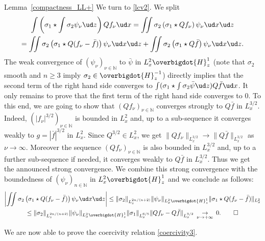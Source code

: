 \begin{ProofOf}{Lemma~\ref{compactness_LL+}}
We turn to \eqref{lcv2}. We split
\begin{multline*}
\int\left(\sigma_{1}\star\int\sigma_{2}\psi_{\nu}\ud z\right)Qf_{\nu}\ud x=\iint\sigma_{2}\left(\sigma_{1}\star Qf_{\nu}\right)\psi_{\nu}\ud x\ud z\\
=\iint\sigma_{2}\left(\sigma_{1}\star Q(f_{\nu}-\bar{f})\right)\psi_{\nu}\ud x\ud z+\iint\sigma_{2}\left(\sigma_{1}\star Q\bar{f}\right)\psi_{\nu}\ud x\ud z.
\end{multline*}
The weak convergence of $(\psi_{\nu})_{\nu\in\mathbb N}$ to $\bar{\psi}$ in $L_{x}^{2}\overbigdot{H}_{z}^{1}$ (note that $\sigma_{2}$ smooth and $n\geq 3$ imply $\sigma_{2}\in\overbigdot{H}_{z}^{-1}$) directly implies that
the second term of the right hand side converges to $\int(\sigma_{1}\star\int\sigma_{2}\bar{\psi}\ud z)Q\bar{f}\ud x$.
It only remains to prove that the first term of the right hand side converges to $0$.
To this end, we are going to show
that $(Qf_{\nu})_{\nu\in\mathbb N}$ converges strongly to $Q\bar{f}$ in $L_{x}^{3/2}$. Indeed, $(|f_{\nu}|^{3/2})_{\nu\in\mathbb N}$ is bounded in $L_{x}^{2}$ and, up to a sub-sequence it converges weakly to $g=|\bar{f}|^{3/2}$ in $L_{x}^{2}$. Since $Q^{3/2}\in L_{x}^{2}$, we get $\|Qf_{\nu}\|_{L_{x}^{3/2}}\to\|Q\bar{f}\|_{L_{x}^{3/2}}$ as $\nu\to \infty$. Moreover the sequence $(Qf_{\nu})_{\nu\in\mathbb N}$ is also bounded in $L_{x}^{3/2}$ and, up to a further sub-sequence if needed, it converges weakly to $Q\bar{f}$ in $L_{x}^{3/2}$. Thus we get the announced strong convergence. We combine this strong convergence with the boundedness of $(\psi_{\nu})_{n\in \mathbb N}$ in $L_{x}^{2}\overbigdot{H}_{z}^{1}$ and we conclude as follows:
\bgroup
{}
\begin{multline*}
\left|\iint\sigma_{2}\left(\sigma_{1}\star Q(f_{\nu}-\bar{f})\right)\psi_{\nu}\ud x\ud z\right|\leq\|\sigma_{2}\|_{L_{z}^{2n/(n+2)}}\|\psi_{\nu}\|_{L_{x}^{2}\overbigdot{H}_{z}^{1}}\|\sigma_{1}\star Q(f_{\nu}-\bar{f})\|_{L_{x}^{2}}\\
\leq\|\sigma_{2}\|_{L_{z}^{2n/(n+2)}}\|\psi_{\nu}\|_{L_{x}^{2}\overbigdot{H}_{z}^{1}}\|\sigma_{1}\|_{L_{x}^{6/5}}\|Qf_{\nu}-Q\bar{f}\|_{L_{x}^{3/2}}\,\underset{\nu\to+\infty}{\to}\,0.\qedhere
\end{multline*}\egroup
\end{ProofOf}

We are now able to prove the coercivity relation \eqref{coercivity3}.


